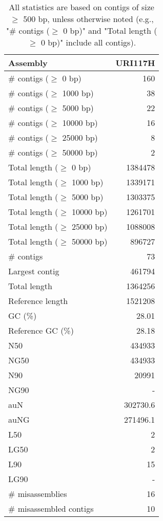 \documentclass[12pt,a4paper]{article}
\begin{document}
\begin{table}[ht]
\begin{center}
\caption{All statistics are based on contigs of size $\geq$ 500 bp, unless otherwise noted (e.g., "\# contigs ($\geq$ 0 bp)" and "Total length ($\geq$ 0 bp)" include all contigs).}
\begin{tabular}{|l*{1}{|r}|}
\hline
Assembly & URI117H \\ \hline
\# contigs ($\geq$ 0 bp) & 160 \\ \hline
\# contigs ($\geq$ 1000 bp) & 38 \\ \hline
\# contigs ($\geq$ 5000 bp) & 22 \\ \hline
\# contigs ($\geq$ 10000 bp) & 16 \\ \hline
\# contigs ($\geq$ 25000 bp) & 8 \\ \hline
\# contigs ($\geq$ 50000 bp) & 2 \\ \hline
Total length ($\geq$ 0 bp) & 1384478 \\ \hline
Total length ($\geq$ 1000 bp) & 1339171 \\ \hline
Total length ($\geq$ 5000 bp) & 1303375 \\ \hline
Total length ($\geq$ 10000 bp) & 1261701 \\ \hline
Total length ($\geq$ 25000 bp) & 1088008 \\ \hline
Total length ($\geq$ 50000 bp) & 896727 \\ \hline
\# contigs & 73 \\ \hline
Largest contig & 461794 \\ \hline
Total length & 1364256 \\ \hline
Reference length & 1521208 \\ \hline
GC (\%) & 28.01 \\ \hline
Reference GC (\%) & 28.18 \\ \hline
N50 & 434933 \\ \hline
NG50 & 434933 \\ \hline
N90 & 20991 \\ \hline
NG90 & - \\ \hline
auN & 302730.6 \\ \hline
auNG & 271496.1 \\ \hline
L50 & 2 \\ \hline
LG50 & 2 \\ \hline
L90 & 15 \\ \hline
LG90 & - \\ \hline
\# misassemblies & 16 \\ \hline
\# misassembled contigs & 10 \\ \hline

\end{tabular}
\end{center}
\end{table}
\end{document}
